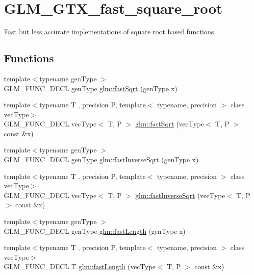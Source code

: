 \hypertarget{group__gtx__fast__square__root}{}\section{G\+L\+M\+\_\+\+G\+T\+X\+\_\+fast\+\_\+square\+\_\+root}
\label{group__gtx__fast__square__root}


Fast but less accurate implementations of square root based functions.  


\subsection*{Functions}
\begin{DoxyCompactItemize}
\item 
{\footnotesize template$<$typename gen\+Type $>$ }\\G\+L\+M\+\_\+\+F\+U\+N\+C\+\_\+\+D\+E\+CL gen\+Type \hyperlink{group__gtx__fast__square__root_ga6c460e9414a50b2fc455c8f64c86cdc9}{glm\+::fast\+Sqrt} (gen\+Type x)
\item 
{\footnotesize template$<$typename T , precision P, template$<$ typename, precision $>$ class vec\+Type$>$ }\\G\+L\+M\+\_\+\+F\+U\+N\+C\+\_\+\+D\+E\+CL vec\+Type$<$ T, P $>$ \hyperlink{group__gtx__fast__square__root_gaad9f601bbc3faa04dda384e4c4e1592c}{glm\+::fast\+Sqrt} (vec\+Type$<$ T, P $>$ const \&x)
\item 
{\footnotesize template$<$typename gen\+Type $>$ }\\G\+L\+M\+\_\+\+F\+U\+N\+C\+\_\+\+D\+E\+CL gen\+Type \hyperlink{group__gtx__fast__square__root_ga7f081b14d9c7035c8714eba5f7f75a8f}{glm\+::fast\+Inverse\+Sqrt} (gen\+Type x)
\item 
{\footnotesize template$<$typename T , precision P, template$<$ typename, precision $>$ class vec\+Type$>$ }\\G\+L\+M\+\_\+\+F\+U\+N\+C\+\_\+\+D\+E\+CL vec\+Type$<$ T, P $>$ \hyperlink{group__gtx__fast__square__root_ga903878071f92e51e551791e584a171a1}{glm\+::fast\+Inverse\+Sqrt} (vec\+Type$<$ T, P $>$ const \&x)
\item 
{\footnotesize template$<$typename gen\+Type $>$ }\\G\+L\+M\+\_\+\+F\+U\+N\+C\+\_\+\+D\+E\+CL gen\+Type \hyperlink{group__gtx__fast__square__root_gafe697d6287719538346bbdf8b1367c59}{glm\+::fast\+Length} (gen\+Type x)
\item 
{\footnotesize template$<$typename T , precision P, template$<$ typename, precision $>$ class vec\+Type$>$ }\\G\+L\+M\+\_\+\+F\+U\+N\+C\+\_\+\+D\+E\+CL T \hyperlink{group__gtx__fast__square__root_gae28a3099cbd6404a4ea8ef22147ed7b0}{glm\+::fast\+Length} (vec\+Type$<$ T, P $>$ const \&x)

\end{DoxyCompactItemize}
